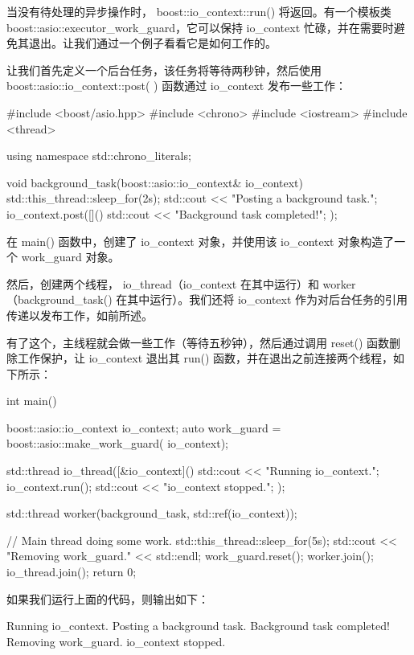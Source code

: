 当没有待处理的异步操作时， boost::io\_context::run() 将返回。有一个模板类 boost::asio::executor\_work\_guard，它可以保持 io\_context 忙碌，并在需要时避免其退出。让我们通过一个例子看看它是如何工作的。

让我们首先定义一个后台任务，该任务将等待两秒钟，然后使用 boost::asio::io\_context::post( ) 函数通过 io\_context 发布一些工作：

\begin{cpp}
#include <boost/asio.hpp>
#include <chrono>
#include <iostream>
#include <thread>

using namespace std::chrono_literals;

void background_task(boost::asio::io_context& io_context) {
    std::this_thread::sleep_for(2s);
    std::cout << "Posting a background task.\n";
    io_context.post([]() {
        std::cout << "Background task completed!\n";
    });
}
\end{cpp}

在 main() 函数中，创建了 io\_context 对象，并使用该 io\_context 对象构造了一个 work\_guard 对象。

然后，创建两个线程， io\_thread（io\_context 在其中运行）和 worker（background\_task() 在其中运行）。我们还将 io\_context 作为对后台任务的引用传递以发布工作，如前所述。

有了这个，主线程就会做一些工作（等待五秒钟），然后通过调用 reset() 函数删除工作保护，让 io\_context 退出其 run() 函数，并在退出之前连接两个线程，如下所示：

\begin{cpp}
int main() {
    boost::asio::io_context io_context;
    auto work_guard = boost::asio::make_work_guard(
                      io_context);

    std::thread io_thread([&io_context]() {
        std::cout << "Running io_context.\n";
        io_context.run();
        std::cout << "io_context stopped.\n";
    });

    std::thread worker(background_task,
                        std::ref(io_context));

    // Main thread doing some work.
    std::this_thread::sleep_for(5s);
    std::cout << "Removing work_guard." << std::endl;
    work_guard.reset();
    worker.join();
    io_thread.join();
    return 0;
}
\end{cpp}

如果我们运行上面的代码，则输出如下：

\begin{shell}
Running io_context.
Posting a background task.
Background task completed!
Removing work_guard.
io_context stopped.
\end{shell}

